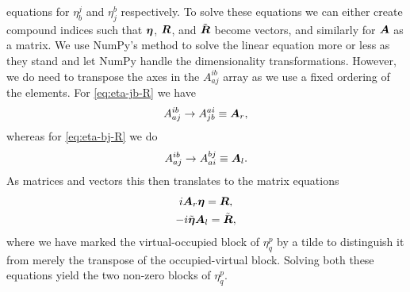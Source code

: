             equations for $\eta^{j}_{b}$ and $\eta^{b}_{j}$ respectively.
            To solve these equations we can either create compound indices such
            that $\boldsymbol{\eta}$, $\boldsymbol{R}$, and $\tilde{\boldsymbol{R}}$ become vectors,
            and similarly for $\boldsymbol{A}$ as a matrix.
            We use NumPy's method  \cite{numpy} to
            solve the linear equation more or less as they stand and let NumPy
            handle the dimensionality transformations.
            However, we do need to transpose the axes in the $A^{ib}_{aj}$
            array as we use a fixed ordering of the elements.
            For \autoref{eq:eta-jb-R} we have
            \begin{align}
                A^{ib}_{aj} \to A^{ai}_{jb} \equiv \boldsymbol{A}_r,
            \end{align}
            whereas for \autoref{eq:eta-bj-R} we do
            \begin{align}
                A^{ib}_{aj} \to A^{bj}_{ai} \equiv \boldsymbol{A}_l.
            \end{align}
            As matrices and vectors this then translates to the matrix equations
            \begin{gather}
                i \boldsymbol{A}_r \boldsymbol{\eta} = \boldsymbol{R},
                \\
                -i\tilde{\boldsymbol{\eta}}\boldsymbol{A}_l = \tilde{\boldsymbol{R}},
            \end{gather}
            where we have marked the virtual-occupied block of $\eta^{p}_{q}$ by a
            tilde to distinguish it from merely the transpose of the
            occupied-virtual block.
            Solving both these equations yield the two non-zero blocks of
            $\eta^{p}_{q}$.


